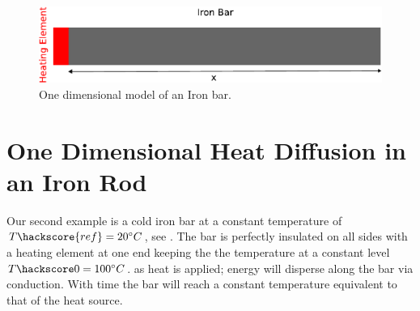 
%
%
%
\begin{figure}[ht]
\centerline{\includegraphics[width=4.in]{figures/onedheatdiff002}}
\caption{One dimensional model of an Iron bar.}
\label{fig:onedhdmodel}
\end{figure}

\section{One Dimensional Heat Diffusion in an Iron Rod}
\label{Sec:1DHDv0}

Our second example is a cold iron bar at a constant temperature of $T\hackscore{ref}=20^{\circ} C$, see . The bar is perfectly insulated on all sides with a heating element at one end keeping the the temperature at a constant level $T\hackscore0=100^{\circ} C$.  as heat is applied; energy will disperse along the bar via conduction. With time the bar will reach a constant temperature equivalent to that of the heat source.

